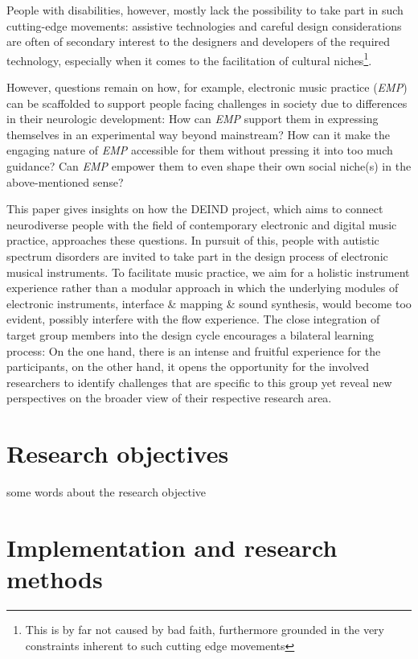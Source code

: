 \documentclass{chi-ext}
\begin{document}
\begin{multicols}{2}
People with disabilities, however, mostly lack the possibility to take part in such cutting-edge movements: 
assistive technologies and careful design considerations are often of secondary interest to the designers and developers of the required technology, especially when it comes to the facilitation of cultural niches\footnote{This is by far not caused by bad faith, furthermore grounded in the very constraints inherent to such cutting edge movements}.

However, questions remain on how, for example, electronic music practice (\emph{EMP}) can be scaffolded to support people facing challenges in society due to differences in their neurologic development:
How can \emph{EMP} support them in expressing themselves in an experimental way beyond mainstream? 
How can it make the engaging nature of \emph{EMP} accessible for them without pressing it into too much guidance?
Can \emph{EMP} empower them to even shape their own social niche(s) in the above-mentioned sense?

This paper gives insights on how the DEIND project, which aims to connect neurodiverse people with the field of contemporary electronic and digital music practice, approaches these questions.
In pursuit of this, people with autistic spectrum disorders are invited to take part in the design process of electronic musical instruments. 
To facilitate music practice, we aim for a holistic instrument experience rather than a modular approach in which the underlying modules of electronic instruments, interface \& mapping \& sound synthesis, would become too evident, possibly interfere with the flow experience. 
The close integration of target group members into the design cycle encourages a bilateral learning process: 
On the one hand, there is an intense and fruitful experience for the participants, on the other hand, it opens the opportunity for the involved researchers to identify challenges that are specific to this group yet reveal new perspectives on the broader view of their respective research area.

\section{Research objectives}
\label{sec:research_objectives}

some words about the research objective

\section{Implementation and research methods}
\label{sec:timeline}


\end{multicols}
\end{document}
